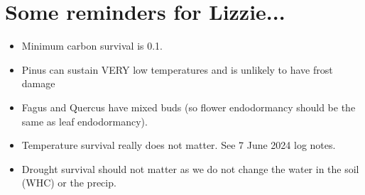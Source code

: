 \documentclass[11pt,letter]{article}
\begin{document}
\section{Some reminders for Lizzie... }
\begin{itemize}
\item Minimum carbon survival is 0.1. 
\item Pinus can sustain VERY low temperatures and is unlikely to have frost damage
\item Fagus and Quercus have mixed buds (so flower endodormancy should be the same as leaf endodormancy).
\item Temperature survival really does not matter. See 7 June 2024 log notes.
\item Drought survival should not matter as we do not change the water in the soil (WHC) or the precip. 
\end{itemize}
\end{document}
